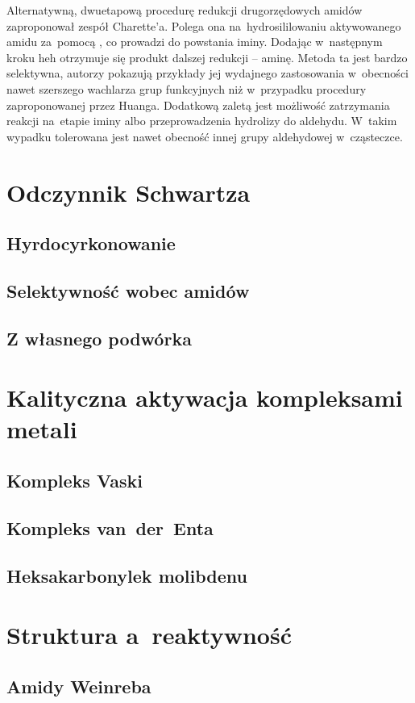 Alternatywną, dwuetapową procedurę redukcji drugorzędowych amidów zaproponował zespół Charette'a.
Polega ona na~hydrosililowaniu aktywowanego amidu za~pomocą , co prowadzi do powstania iminy.
Dodając w~następnym kroku \gls{heh} otrzymuje się produkt dalszej redukcji \--- aminę.
Metoda ta jest bardzo selektywna, autorzy pokazują przykłady jej wydajnego zastosowania w~obecności nawet szerszego wachlarza
  grup funkcyjnych niż w~przypadku procedury zaproponowanej przez Huanga.
Dodatkową zaletą jest możliwość zatrzymania reakcji na~etapie iminy albo przeprowadzenia hydrolizy do aldehydu.
W~takim wypadku tolerowana jest nawet obecność innej grupy aldehydowej w~cząsteczce\autocite{charette10}.

\section{Odczynnik Schwartza}
\subsection{Hyrdocyrkonowanie}
\subsection{Selektywność wobec amidów}
\subsection{Z własnego podwórka}

\section{Kalityczna aktywacja kompleksami metali}
\subsection{Kompleks Vaski}
\subsection{Kompleks van~der~Enta}
\subsection{Heksakarbonylek molibdenu}

\section{Struktura a~reaktywność}
\subsection{Amidy Weinreba}
